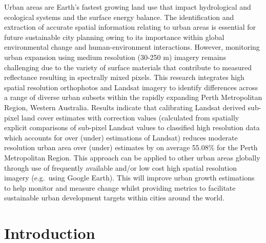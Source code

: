 \documentclass[]{book}
\begin{document}
Urban areas are Earth's fastest growing land use that impact
hydrological and ecological systems and the surface energy balance. The
identification and extraction of accurate spatial information relating
to urban areas is essential for future sustainable city planning owing
to its importance within global environmental change and
human-environment interactions. However, monitoring urban expansion
using medium resolution (30-250 m) imagery remains challenging due to
the variety of surface materials that contribute to measured reflectance
resulting in spectrally mixed pixels. This research integrates high
spatial resolution orthophotos and Landsat imagery to identify
differences across a range of diverse urban subsets within the rapidly
expanding Perth Metropolitan Region, Western Australia. Results indicate
that calibrating Landsat derived sub-pixel land cover estimates with
correction values (calculated from spatially explicit comparisons of
sub-pixel Landsat values to classified high resolution data which
accounts for over (under) estimations of Landsat) reduces moderate
resolution urban area over (under) estimates by on average 55.08\% for
the Perth Metropolitan Region. This approach can be applied to other
urban areas globally through use of frequently available and/or low cost
high spatial resolution imagery (e.g.~using Google Earth). This will
improve urban growth estimations to help monitor and measure change
whilst providing metrics to facilitate sustainable urban development
targets within cities around the world.

\section{Introduction}\label{introduction-4}
\end{document}
